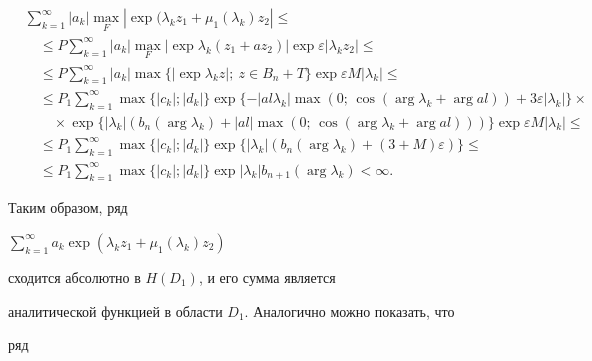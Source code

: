 \begin{align*} 


&\sum^\infty_{k=1}|a_k|\max_F|\exp(\lambda_k z_1+ 


\mu_1(\lambda_k)z_2|\le \\


%


&\quad\le P\sum^\infty_{k=1}|a_k|\max_F|\exp\lambda_k 


(z_1+a z_2)|\exp\varepsilon|\lambda_k z_2|\le \\ 


%


&\quad\le P\sum^\infty_{k=1}|a_k|\max\{|\exp\lambda_k z|;\ z\in B_n+T\} 


\exp\varepsilon M|\lambda_k|\le \\ 


%


&\quad\le P_1\sum^\infty_{k=1}\max\{|c_k|;|d_k|\}\exp 


\{-|al\lambda_k|\max(0;\,\cos(\arg\lambda_k+\arg al))+ 


3\varepsilon|\lambda_k|\}\times \\ 


%


&\qquad\times \exp\{|\lambda_k|(b_n(\arg\lambda_k)+ 


|al|\max(0;\,\cos(\arg\lambda_k+\arg al)))\} 


\exp\varepsilon M|\lambda_k|\le \\ 


%


&\quad\le P_1\sum^\infty_{k=1}\max\{|c_k|;|d_k|\}\exp 


\{|\lambda_k|(b_n(\arg\lambda_k)+ 


(3+M)\varepsilon)\}\le \\ 


%


&\quad\le P_1\sum^\infty_{k=1}\max\{|c_k|;|d_k|\}\exp 


|\lambda_k|b_{n+1}(\arg\lambda_k)<\infty. 


\end{align*} 


Таким образом, ряд 


$\sum\limits^\infty_{k=1}a_k\exp(\lambda_k z_1+\mu_1(\lambda_k)z_2)$ 


сходится абсолютно в $H(D_1)$, и его сумма является 


аналитической функцией в области $D_1$. Аналогично можно показать, что 


ряд 


